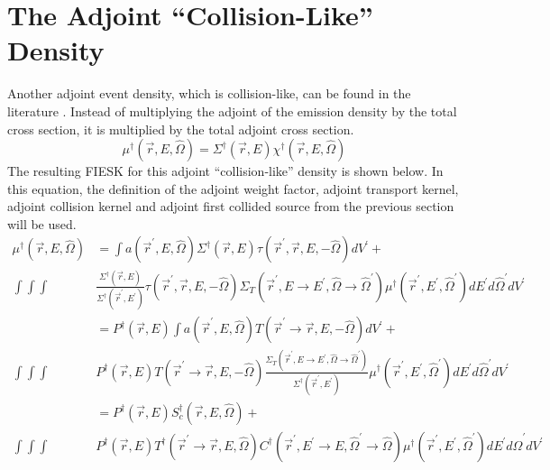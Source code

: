 \section{The Adjoint ``Collision-Like'' Density}
Another adjoint event density, which is collision-like, can be found in the 
literature \citep{kalos_monte_1968, eriksson_monte_1969}. Instead of 
multiplying the adjoint of the emission density by the total cross section, it 
is multiplied by the total adjoint cross section.
\begin{equation}
  \mu^{\dagger}(\vec{r},E,\hat{\Omega}) = \Sigma^{\dagger}(\vec{r},E)
  \chi^{\dagger}(\vec{r},E,\hat{\Omega})
  \label{eq:adj_collision_like_dens_to_adjoint_of_emission_dens}
\end{equation}
The resulting FIESK for this adjoint ``collision-like'' density is shown below.
In this equation, the definition of the adjoint weight factor, adjoint
transport kernel, adjoint collision kernel and adjoint first collided 
source from the previous section will be used.
\begin{align}
  \mu^{\dagger}(\vec{r},E,\hat{\Omega}) & = \int a(\vec{r}^{'},E,\hat{\Omega}) 
  \Sigma^{\dagger}(\vec{r},E) \tau(\vec{r}^{'},\vec{r},E,-\hat{\Omega}) 
  dV^{'} + \nonumber \\
  \int\int\int  & \frac{\Sigma^{\dagger}(\vec{r},E)}
                       {\Sigma^{\dagger}(\vec{r}^{'},E^{'})}
  \tau(\vec{r}^{'},\vec{r},E,-\hat{\Omega}) 
  \Sigma_T(\vec{r}^{'},E \to E^{'},\hat{\Omega} \to \hat{\Omega}^{'})
  \mu^{\dagger}(\vec{r}^{'},E^{'},\hat{\Omega}^{'}) dE^{'}d\hat{\Omega}^{'}dV^{'}
  \nonumber \\
  & = P^{\dagger}(\vec{r},E) \int
  a(\vec{r}^{'},E,\hat{\Omega}) 
  T(\vec{r}^{'} \to \vec{r},E,-\hat{\Omega}) dV^{'} + \nonumber \\
  \int\int\int &P^{\dagger}(\vec{r},E) 
  T(\vec{r}^{'} \to \vec{r},E,-\hat{\Omega})
  \frac{\Sigma_T(\vec{r}^{'},E \to E^{'},\hat{\Omega} \to \hat{\Omega}^{'})}
       {\Sigma^{\dagger}(\vec{r}^{'},E^{'})}
  \mu^{\dagger}(\vec{r}^{'},E^{'},\hat{\Omega}^{'}) dE^{'}d\hat{\Omega}^{'}dV^{'}
  \nonumber \\
  & = P^{\dagger}(\vec{r},E) 
  S_c^{\dagger}(\vec{r},E,\hat{\Omega}) + \nonumber \\
  \int\int\int &P^{\dagger}(\vec{r},E) 
  T^{\dagger}(\vec{r}^{'} \to \vec{r},E,\hat{\Omega})
  C^{\dagger}(\vec{r}^{'},E^{'} \to E,\hat{\Omega}^{'} \to \hat{\Omega})
  \mu^{\dagger}(\vec{r}^{'},E^{'},\hat{\Omega}^{'}) dE^{'}d\hat{\Omega}^{'}dV^{'}
  \nonumber 
\end{align}


